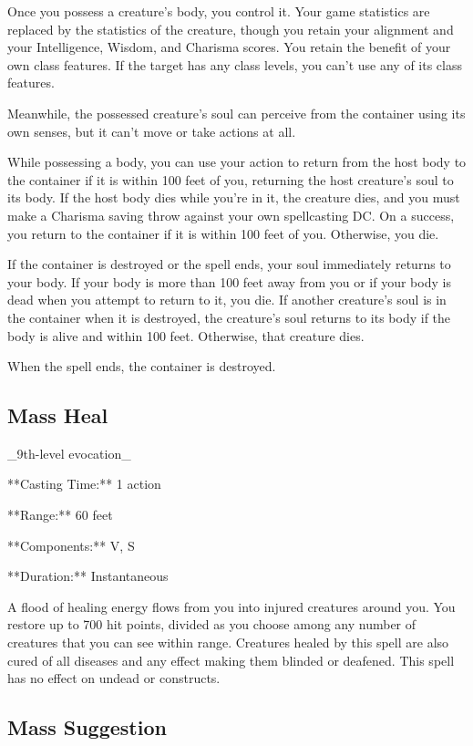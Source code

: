 Once you possess a creature’s body, you control it. Your game statistics are replaced by the statistics of the creature, though you retain your alignment and your Intelligence, Wisdom, and Charisma scores. You retain the benefit of your own class features. If the target has any class levels, you can’t use any of its class features.

Meanwhile, the possessed creature’s soul can perceive from the container using its own senses, but it can’t move or take actions at all.

While possessing a body, you can use your action to return from the host body to the container if it is within 100 feet of you, returning the host creature’s soul to its body. If the host body dies while you’re in it, the creature dies, and you must make a Charisma saving throw against your own spellcasting DC. On a success, you return to the container if it is within 100 feet of you. Otherwise, you die.

If the container is destroyed or the spell ends, your soul immediately returns to your body. If your body is more than 100 feet away from you or if your body is dead when you attempt to return to it, you die. If another creature’s soul is in the container when it is destroyed, the creature’s soul returns to its body if the body is alive and within 100 feet. Otherwise, that creature dies.

When the spell ends, the container is destroyed.

\subsection{Mass Heal}

_9th-level evocation_

**Casting Time:** 1 action

**Range:** 60 feet

**Components:** V, S

**Duration:** Instantaneous

A flood of healing energy flows from you into injured creatures around you. You restore up to 700 hit points, divided as you choose among any number of creatures that you can see within range. Creatures healed by this spell are also cured of all diseases and any effect making them blinded or deafened. This spell has no effect on undead or constructs.

\subsection{Mass Suggestion}

